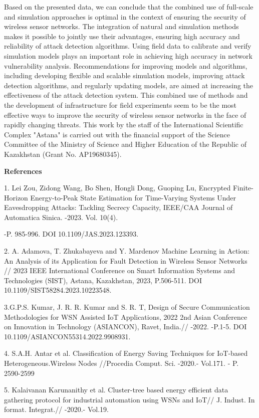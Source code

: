 Based on the presented data, we can conclude that the combined use of
full-scale and simulation approaches is optimal in the context of
ensuring the security of wireless sensor networks. The integration of
natural and simulation methods makes it possible to jointly use their
advantages, ensuring high accuracy and reliability of attack detection
algorithms. Using field data to calibrate and verify simulation models
plays an important role in achieving high accuracy in network
vulnerability analysis. Recommendations for improving models and
algorithms, including developing flexible and scalable simulation
models, improving attack detection algorithms, and regularly updating
models, are aimed at increasing the effectiveness of the attack
detection system. This combined use of methods and the development of
infrastructure for field experiments seem to be the most effective ways
to improve the security of wireless sensor networks in the face of
rapidly changing threats. This work by the staff of the International
Scientific Complex "Astana" is carried out with the financial support of
the Science Committee of the Ministry of Science and Higher Education of
the Republic of Kazakhstan (Grant No. AP19680345).

{\bfseries References}

1. Lei Zou, Zidong Wang, Bo Shen, Hongli Dong, Guoping Lu, Encrypted
Finite-Horizon Energy-to-Peak State Estimation for Time-Varying Systems
Under Eavesdropping Attacks: Tackling Secrecy Capacity, IEEE/CAA Journal
of Automatica Sinica. -2023. Vol. 10(4).

-P. 985-996. DOI 10.1109/JAS.2023.123393.

2. A. Adamova, T. Zhukabayeva and Y. Mardenov Machine Learning in
Action: An Analysis of its Application for Fault Detection in Wireless
Sensor Networks // 2023 IEEE International Conference on Smart
Information Systems and Technologies (SIST), Astana, Kazakhstan, 2023,
P.506-511. DOI 10.1109/SIST58284.2023.10223548.

3.G.P.S. Kumar, J. R. R. Kumar and S. R. T, Design of Secure
Communication Methodologies for WSN Assisted IoT Applications, 2022 2nd
Asian Conference on Innovation in Technology (ASIANCON), Ravet, India.//
-2022. -P.1-5. DOI 10.1109/ASIANCON55314.2022.9908931.

4. S.A.H. Antar et al. Classification of Energy Saving Techniques for
IoT-based Heterogeneous.Wireless Nodes //Procedia Comput. Sci. -2020.-
Vol.171. - P. 2590-2599

5. Kalaivanan Karunanithy et al. Cluster-tree based energy efficient
data gathering protocol for industrial automation using WSNs and IoT//
J. Indust. In format. Integrat.// -2020.- Vol.19.

